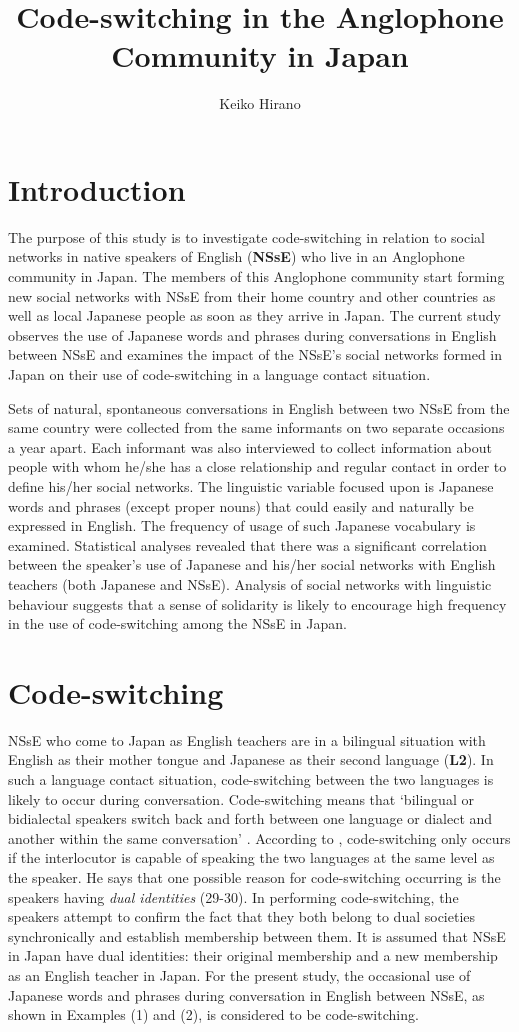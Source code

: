\documentclass[output=paper]{LSP/langsci}
\author{Keiko Hirano\affiliation{University of Kitakyushu, Japan}}
\title{Code-switching in the Anglophone Community in Japan}
\begin{document}
   

 
\section{Introduction}
The purpose of this study is to investigate code-switching in relation to social networks in native speakers of English (\textbf{NSsE}) who live in an Anglophone community in Japan. The members of this Anglophone community start forming new social networks with NSsE from their home country and other countries as well as local Japanese people as soon as they arrive in Japan. The current study observes the use of Japanese words and phrases during conversations in English between NSsE and examines the impact of the NSsE’s social networks formed in Japan on their use of code-switching in a language contact situation.

Sets of natural, spontaneous conversations in English between two NSsE from the same country were collected from the same informants on two separate occasions a year apart. Each informant was also interviewed to collect information about people with whom he/she has a close relationship and regular contact in order to define his/her social networks. The linguistic variable focused upon is Japanese words and phrases (except proper nouns) that could easily and naturally be expressed in English. The frequency of usage of such Japanese vocabulary is examined. Statistical analyses revealed that there was a significant correlation between the speaker’s use of Japanese and his/her social networks with English teachers (both Japanese and NSsE). Analysis of social networks with linguistic behaviour suggests that a sense of solidarity is likely to encourage high frequency in the use of code-switching among the NSsE in Japan.

\section{Code-switching}
NSsE who come to Japan as English teachers are in a bilingual situation with English as their mother tongue and Japanese as their second language (\textbf{L2}). In such a language contact situation, code-switching between the two languages is likely to occur during conversation. Code-switching means that ‘bilingual or bidialectal speakers switch back and forth between one language or dialect and another within the same conversation’ \citep[23]{trudgill_glossary_2003}. According to \citet[26]{azuma_shakai_1997}, code-switching only occurs if the interlocutor is capable of speaking the two languages at the same level as the speaker. He says that one possible reason for code-switching occurring is the speakers having \textit{dual identities} (29-30). In performing code-switching, the speakers attempt to confirm the fact that they both belong to dual societies synchronically and establish membership between them. It is assumed that NSsE in Japan have dual identities: their original membership and a new membership as an English teacher in Japan. For the present study, the occasional use of Japanese words and phrases during conversation in English between NSsE, as shown in Examples (1) and (2), is considered to be code-switching.
\end{document}

